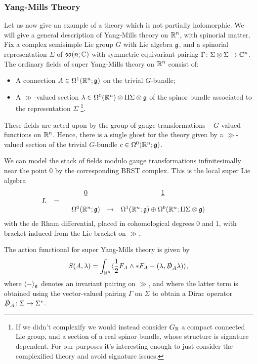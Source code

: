 \documentclass[10pt, oneside]{article}
\begin{document}
\subsubsection{Yang-Mills Theory} \label{YM_section}
Let us now give an example of a theory which is not partially holomorphic.  We will give a general description of Yang-Mills theory on $\mathbb R^n$, with spinorial matter.  Fix a complex semisimple Lie group $G$ with Lie algebra $\mathfrak g$, and a spinorial representation $\Sigma$ of $\mathfrak{so}(n;\mathbb C)$ with symmetric equivariant pairing $\Gamma \colon \Sigma \otimes \Sigma \to \mathbb C^n$.  The ordinary fields of super Yang-Mills theory on $\mathbb R^{n}$ consist of:
\begin{itemize}
\item A connection $A \in \Omega^1(\mathbb R^{n} ; \mathfrak g)$ on the trivial $G$-bundle;
\item A $\gg$-valued section $\lambda \in \Omega^0(\mathbb R^{n}) \otimes \Pi \Sigma \otimes \mathfrak g$ of the spinor bundle associated to the representation $\Sigma$
\footnote{If we didn't complexify we would instead consider $G_\mathbb R$ a compact connected Lie group, and a section of a real spinor bundle, whose structure is signature dependent.  For our purposes it's interesting enough to just consider the complexified theory and avoid signature issues.}.  
\end{itemize}
These fields are acted upon by the group of gauge transformations -- $G$-valued functions on $\mathbb R^{n}$. 
Hence, there is a single ghost for the theory given by a $\gg$-valued section of the trivial $G$-bundle $c \in \Omega^0(\mathbb R^{n} ; \mathfrak g)$. 

We can model the stack of fields modulo gauge transformations infinitesimally near the point $0$ by the corresponding BRST complex.  This is the local super Lie algebra
\[
L \;\;\; = \begin{array}{ccccc}
& \underline{0} & & \underline{1} & \\ 
& & & & \\
& \Omega^0(\mathbb R^{n}; \mathfrak{g}) & \to & \Omega^1(\mathbb R^{n}; \mathfrak{g}) \oplus \Omega^0(\mathbb R^{n}; \Pi \Sigma \otimes \mathfrak{g}) & 
\end{array}
\]
with the de Rham differential, placed in cohomological degrees 0 and 1, with bracket induced from the Lie bracket on $\gg$.

The action functional for super Yang-Mills theory is given by
\[S(A,\lambda) = \int_{\mathbb R^{n}} \langle \frac{1}{2} F_A \wedge \ast F_A - (\lambda, \slashed{D}_A \lambda)\rangle,\]
where $\langle - \rangle_\mathfrak g$ denotes an invariant pairing on $\gg$, and where the latter term is obtained using the vector-valued pairing $\Gamma$ on $\Sigma$ to obtain a Dirac operator $\slashed{D}_A \colon \Sigma \to \Sigma^*$. 
\end{document}
